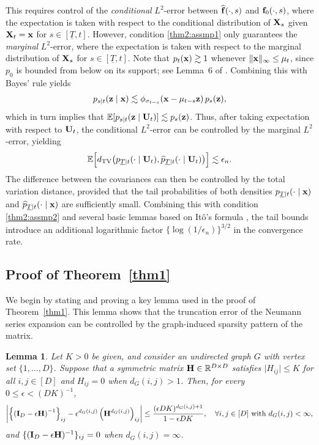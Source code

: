 \documentclass[11pt,a4paper,final]{article}
\numberwithin{equation}{section}
\newtheorem{lemma}[theorem]{Lemma}
\theoremstyle{remark}
\newcommand{\bff}{{\bf f}}
\newcommand{\bH}{{\bf H}}
\newcommand{\bI}{{\bf I}}
\newcommand{\bU}{{\bf U}}
\newcommand{\bx}{{\bf x}}
\newcommand{\bX}{{\bf X}}
\newcommand{\bz}{{\bf z}}
\newcommand{\bbE}{{\mathbb E}}
\newcommand{\bbR}{{\mathbb R}}
\newcommand{\bean}{\setlength\arraycolsep{1pt}\begin{eqnarray*}}
\newcommand{\eean}{\end{eqnarray*}}
\begin{document}
This requires control of the \textit{conditional} $L^2$-error between $\widehat \bff(\cdot, s)$ and $\bff_{0}(\cdot,s)$, where the expectation is taken with respect to the conditional distribution of $\bX_{s}$ given $\bX_{t} = \bx$ for $s \in [\underline{T},t]$.
However, condition \eqref{thm2:assmp1} only guarantees the \textit{marginal} $L^2$-error, where the expectation is taken with respect to the marginal distribution of $\bX_{s}$ for $s \in [\underline{T},t]$.
Note that $p_{t}(\bx) \gtrsim 1$ whenever $\| \bx \|_{\infty} \leq \mu_{t}$, since $p_{0}$ is bounded from below on its support; see Lemma~6 of \cite{kwon2026nonparametric}.
Combining this with Bayes' rule yields
\bean
p_{s \mid t} (\bz \mid \bx) \lesssim \phi_{\sigma_{t-s}}(\bx - \mu_{t-s} \bz)\, p_{s} (\bz),
\eean
which in turn implies that $\bbE[ p_{s \mid t}(\bz \mid \bU_{t}) ] \lesssim p_{s}(\bz)$.
Thus, after taking expectation with respect to $\bU_{t}$, the conditional $L^2$-error can be controlled by the marginal $L^2$-error, yielding
\bean
\bbE \Big[ d_{\rm TV} \big( p_{\underline{T} \mid t} (\cdot \mid  \bU_{t}), \widehat p_{\underline{T} \mid t} (\cdot \mid \bU_{t}) \big) \Big]
\lesssim \epsilon_{n}.
\eean
The difference between the covariances can then be controlled by the total variation distance, provided that the tail probabilities of both densities $p_{\underline{T} \mid t}(\cdot \mid \bx)$ and $\widehat p_{\underline{T} \mid t}(\cdot \mid \bx)$ are sufficiently small.
Combining this with condition \eqref{thm2:assmp2} and several basic lemmas based on It\^{o}'s formula \citep{le2016brownian}, the tail bounds introduce an additional logarithmic factor $\{\log (1/\epsilon_{n})\}^{3/2}$ in the convergence rate.




\subsection{Proof of Theorem~\ref{thm1}}
\label{ssec:proof_thm1} 

We begin by stating and proving a key lemma used in the proof of Theorem~\ref{thm1}.
This lemma shows that the truncation error of the Neumann series expansion can be controlled by the graph-induced sparsity pattern of the matrix.

\begin{lemma}\label{lem1}
Let $K > 0$ be given, and consider an undirected graph $G$ with vertex set $\{1,\ldots,D\}$.
Suppose that a symmetric matrix $\bH  \in \bbR^{D \times D}$ satisfies $\vert H_{ij} \vert \leq K$ for all $i,j \in [D]$ and $H_{ij} = 0$ when $d_{G}(i,j) > 1$.
Then, for every $0 \leq \epsilon < (DK)^{-1}$,
\bean
\left\vert \left\{ \left( \bI_{D} - \epsilon \bH \right)^{-1} \right\}_{ij} - \epsilon^{d_{G}(i,j)} \left( \bH^{d_{G}(i,j)} \right)_{ij} \right\vert 
\leq \frac{ (\epsilon D K)^{d_{G}(i,j)+1} }{1-\epsilon D K}
, \quad \forall i, j \in [D] \text{ with } d_{G}(i,j) < \infty,
\eean
and $\{ (\bI_{D} - \epsilon \bH)^{-1}\}_{ij} = 0$ when $d_{G}(i,j) = \infty$.
\end{lemma}
\end{document}
